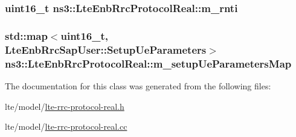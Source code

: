 \subsubsection[{\texorpdfstring{m\+\_\+rnti}{m_rnti}}]{\setlength{\rightskip}{0pt plus 5cm}uint16\+\_\+t ns3\+::\+Lte\+Enb\+Rrc\+Protocol\+Real\+::m\+\_\+rnti\hspace{0.3cm}{\ttfamily [private]}}\hypertarget{classns3_1_1LteEnbRrcProtocolReal_ac20f270448ac81e3f80311f575923320}{}\label{classns3_1_1LteEnbRrcProtocolReal_ac20f270448ac81e3f80311f575923320}
\subsubsection[{\texorpdfstring{m\+\_\+setup\+Ue\+Parameters\+Map}{m_setupUeParametersMap}}]{\setlength{\rightskip}{0pt plus 5cm}std\+::map$<$uint16\+\_\+t, {\bf Lte\+Enb\+Rrc\+Sap\+User\+::\+Setup\+Ue\+Parameters}$>$ ns3\+::\+Lte\+Enb\+Rrc\+Protocol\+Real\+::m\+\_\+setup\+Ue\+Parameters\+Map\hspace{0.3cm}{\ttfamily [private]}}\hypertarget{classns3_1_1LteEnbRrcProtocolReal_ad6da86f1b3a0f7adf856b4141d587c46}{}\label{classns3_1_1LteEnbRrcProtocolReal_ad6da86f1b3a0f7adf856b4141d587c46}


The documentation for this class was generated from the following files\+:\begin{DoxyCompactItemize}
\item 
lte/model/\hyperlink{lte-rrc-protocol-real_8h}{lte-\/rrc-\/protocol-\/real.\+h}\item 
lte/model/\hyperlink{lte-rrc-protocol-real_8cc}{lte-\/rrc-\/protocol-\/real.\+cc}\end{DoxyCompactItemize}
